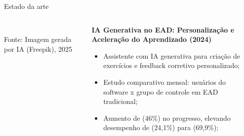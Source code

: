 \documentclass{beamer}
\begin{document}

\begin{frame}{Estado da arte}
\begin{columns}
        \begin{column}{0.35\textwidth}
            \centering
            \\[0.3cm]
            \tiny\textcolor{cpsgray}{Fonte: Imagem gerada por IA (Freepik), 2025}
        \end{column}
        
        \begin{column}{0.6\textwidth}
            \justifying
            \textbf{IA Generativa no EAD: Personalização e Aceleração do Aprendizado (2024)}
            \begin{itemize}
    \item Assistente com IA generativa para criação de exercícios e feedback corretivo personalizado;
    
    \item Estudo comparativo mensal: usuários do software x grupo de controle em EAD tradicional;
    
    \item Aumento de (46\%) no progresso, elevando desempenho de (24,1\%) para (69,9\%);
\end{itemize}
        \end{column}
    \end{columns}
\end{frame}
\end{document}

